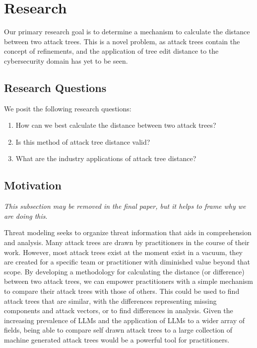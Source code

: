 
\section{Research}

Our primary research goal is to determine a mechanism to calculate the distance between two attack trees. This is a novel problem, as attack trees contain the concept of refinements, and the application of tree edit distance to the cybersecurity domain has yet to be seen.

\subsection{Research Questions}

We posit the following research questions:

\begin{enumerate}
    \item[\RQ{1}] How can we best calculate the distance between two attack trees?
    \item[\RQ{2}] Is this method of attack tree distance valid?
    \item[\RQ{3}] What are the industry applications of attack tree distance?
\end{enumerate}

\subsection{Motivation}

\textit{This subsection may be removed in the final paper, but it helps to frame why we are doing this}.

Threat modeling seeks to organize threat information that aids in comprehension and analysis.  Many attack trees are drawn by practitioners in the course of their work. However, most attack trees exist at the moment exist in a vacuum, they are created for a specific team or practitioner with diminished value beyond that scope. By developing a methodology for calculating the distance (or difference) between two attack trees, we can empower practitioners with a simple mechanism to compare their attack trees with those of others. This could be used to find attack trees that are similar, with the differences representing missing components and attack vectors, or to find differences in analysis. Given the increasing prevalence of LLMs and the application of LLMs to a wider array of fields, being able to compare self drawn attack trees to a large collection of machine generated attack trees would be a powerful tool for practitioners.



